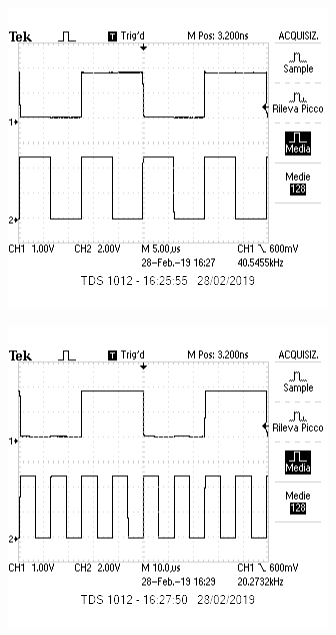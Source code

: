 \documentclass{article}
\begin{document}
	\begin{minipage}{.5\linewidth}
		\centering
		\includegraphics[width=\linewidth]{immagini/f1_2}
		\label{fig:f1_2}
	\end{minipage}
	\begin{minipage}{.5\linewidth}
		\centering
		\includegraphics[width=\linewidth]{immagini/f1_4}
		\label{fig:f1_4}
	\end{minipage}\newline
\end{document}
